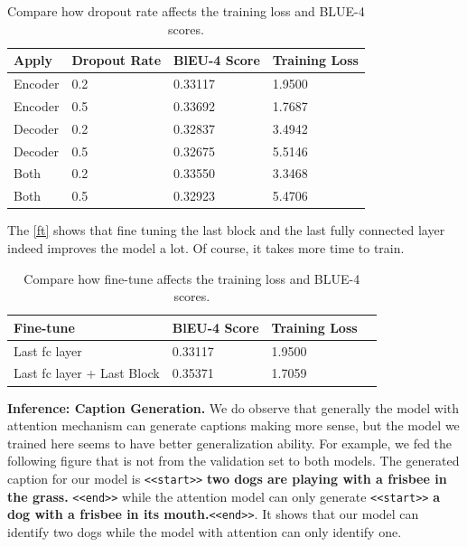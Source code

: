 \documentclass[fleqn,10pt]{SelfArx} %
\begin{document}
\begin{table}[H]
\begin{tabular}{llll}
\hline
Apply & Dropout Rate & BlEU-4 Score & Training Loss \\ \hline
Encoder&          0.2           &   0.33117  & 1.9500        \\ \hline
Encoder&          0.5      &    0.33692   &   1.7687     \\ \hline
Decoder&          0.2        &  0.32837    &   3.4942      \\ \hline
Decoder&          0.5       &   0.32675   &   5.5146     \\ \hline
Both &  0.2                 & 0.33550      & 3.3468       \\ \hline
Both &   0.5                &  0.32923     &     5.4706  \\ \hline
\end{tabular}
\caption{Compare how dropout rate affects the training loss and BLUE-4 scores.}\label{dropout}
\end{table}

The \autoref{ft} shows that fine tuning the last block and the last fully connected layer indeed improves the model a lot. Of course, it takes more time to train.

\begin{table}[H]
\begin{tabular}{llll}
\hline
Fine-tune  & BlEU-4 Score & Training Loss \\ \hline
Last fc layer&         0.33117  & 1.9500        \\ \hline
Last fc layer + Last Block&           0.35371     &   1.7059      \\ \hline
\end{tabular}
\caption{Compare how fine-tune affects the training loss and BLUE-4 scores.}\label{ft}
\end{table}


\textbf{Inference: Caption Generation.} We do observe that generally the model with attention mechanism can generate captions making more sense, but the model we trained here seems to have better generalization ability. For example, we fed the following figure that is not from the validation set to both models. The generated caption for our model is \verb|<<start>>| \textbf{two dogs are playing with a frisbee in the grass.} \verb|<<end>>| while the attention model can only generate \verb|<<start>>|  \textbf{a dog with a frisbee in its mouth.}\verb|<<end>>|. It shows that our model can identify two dogs while the model with attention can only identify one.
\end{document}
